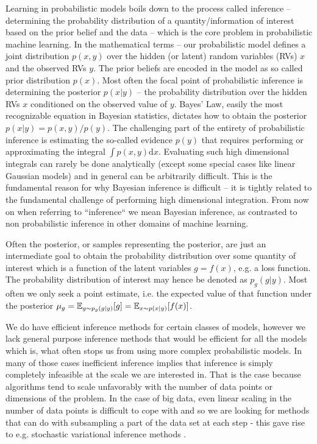 \documentclass[12pt]{article}
\begin{document}
Learning in probabilistic models boils down to the process called inference -- determining the probability distribution of a quantity/information of interest based on the prior belief and the data -- which is the core problem in probabilistic machine learning.
In the mathematical terms -- our probabilistic model defines a joint distribution $p(x,y)$ over the hidden (or latent) random variables (RVs) $x$ and the observed RVs $y$.
The prior beliefs are encoded in the model as so called prior distribution $p(x)$.
Most often the focal point of probabilistic inference is determining the posterior $p(x|y)$ -- the probability distribution over the hidden RVs $x$ conditioned on the observed value of $y$.
Bayes' Law, easily the most recognizable equation in Bayesian statistics, dictates how to obtain the posterior $p(x|y) = p(x,y)/p(y)$.
The challenging part of the entirety of probabilistic inference is estimating the so-called evidence $p(y)$ that requires performing or approximating the integral $\int p(x,y) \text{d}x$.
Evaluating such high dimensional integrals can rarely be done analytically (except some special cases like linear Gaussian models) and in general can be arbitrarily difficult.
This is the fundamental reason for why Bayesian inference is difficult -- it is tightly related to the fundamental challenge of performing high dimensional integration. 
From now on when referring to ``inference`` we mean Bayesian inference, as contrasted to non probabilistic inference in other domains of machine learning.

Often the posterior, or samples representing the posterior, are just an intermediate goal to
obtain the probability distribution over some quantity of interest which is a function of the latent variables $g=f(x)$, e.g. a loss function.
The probability distribution of interest may hence be denoted as $p_g(g|y)$.
Most often we only seek a point estimate, i.e. the expected value of that function under the posterior $\mu_g=\mathbb{E}_{g \sim p_g(g|y)}[g]=\mathbb{E}_{x \sim p(x|y)}[f(x)]$.

We do have efficient inference methods for certain classes of models, however we lack general purpose inference methods that would be efficient for all the models which is, what often stops us from using more complex probabilistic models.
In many of those cases inefficient inference implies that inference is simply completely infeasible at the scale we are interested in.
That is the case because algorithms tend to scale unfavorably with the number of data points or dimensions of the problem.
In the case of big data, even linear scaling in the number of data points is difficult to cope with and so we are looking for methods that can do with subsampling a part of the data set at each step - this gave rise to e.g. stochastic variational inference methods \citep{HoffmanEtAl2013}. 
\end{document}
